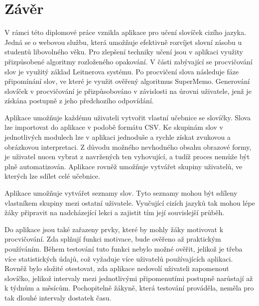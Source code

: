 \documentclass[a4paper,11pt,titlepage,fleqn]{article}
\begin{document}
\newpage
\section{Závěr}
    V rámci této diplomové práce vznikla aplikace pro učení slovíček cizího jazyka. Jedná se o webovou službu, která umožňuje efektivně rozvíjet slovní zásobu u studentů libovolného věku. Pro zlepšení techniky učení jsou v aplikaci využity přizpůsobené algoritmy rozloženého opakování. V části zabývající se procvičování slov je využitý základ Leitnerova systému. Po procvičení slova následuje fáze připomínání slov, ve které je využit ověřený algoritmus SuperMemo. Generování slovíček v procvičování je přizpůsobováno v závislosti na úrovni uživatele, jenž je získána postupně z jeho předchozího odpovídání. 

    Aplikace umožňuje každému uživateli vytvořit vlastní učebnice se slovíčky. Slova lze importovat do aplikace v podobě formátu CSV. Ke skupinám slov v jednotlivých modulech lze v aplikaci jednoduše a rychle získat zvukovou a obrázkovou interpretaci. Z důvodu možného nevhodného obsahu obrazové formy, je uživatel nucen vybrat z navržených ten vyhovující, a tudíž proces nemůže být plně automatizován. Aplikace rovněž umožňuje vytvářet skupiny uživatelů, ve kterých lze sdílet celé učebnice.

    Aplikace umožňuje vytvářet seznamy slov. Tyto seznamy mohou být sdíleny vlastníkem skupiny mezi ostatní uživatele. Vyučující cizích jazyků tak mohou lépe žáky připravit na nadcházející lekci a zajistit tím její souvislejší průběh. 

    Do aplikace jsou také zařazeny prvky, které by mohly žáky motivovat k procvičování. Zda splňují funkci motivace, bude ověřeno až praktickým používáním. Během testování tuto funkci nebylo možné ověřit, jelikož je třeba více statistických údajů, což vyžaduje více uživatelů používajících aplikaci. Rovněž bylo složité otestovat, zda aplikace nedovolí uživateli zapomenout slovíčko, jelikož intervaly mezi jednotlivými připomenutími postupně narůstají až k týdnům a měsícům. Pochopitelně žákyně, která testování prováděla, neměla pro tak dlouhé intervaly dostatek času.
\end{document}
